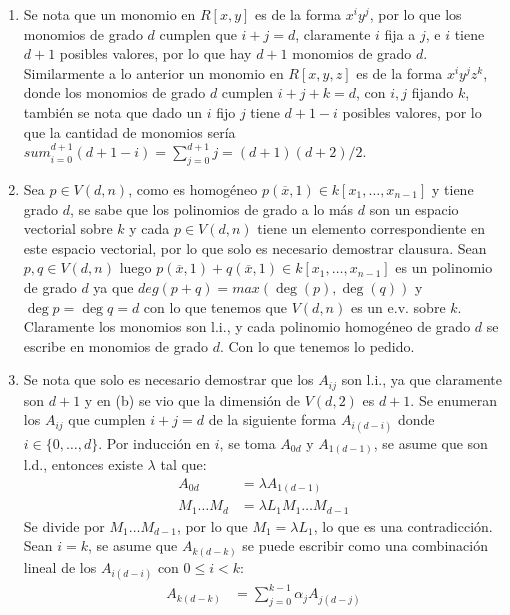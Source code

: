 \begin{sol}{2.35}
    \begin{enumerate}
        \item Se nota que un monomio en \(R[x,y]\) es de la forma \(x^iy^j\), por lo que los monomios de grado \(d\) cumplen que \(i+j=d\), claramente \(i\) fija a \(j\), e \(i\) tiene \(d+1\) posibles valores, por lo que hay \(d+1\) monomios de grado \(d\). Similarmente a lo anterior un monomio en \(R[x,y,z]\) es de la forma \(x^iy^jz^k\), donde los monomios de grado \(d\) cumplen \(i+j+k=d\), con \(i,j\) fijando \(k\), también se nota que dado un \(i\) fijo \(j\) tiene \(d+1-i\) posibles valores, por lo que la cantidad de monomios sería \(sum_{i=0}^{d+1}(d+1-i)=\sum_{j=0}^{d+1}j=(d+1)(d+2)/2\).
        \item Sea \(p\in V(d,n)\), como es homogéneo \(p(\overline{x},1)\in k[x_1,\dots ,x_{n-1}]\) y tiene grado \(d\), se sabe que los polinomios de grado a lo más \(d\) son un espacio vectorial sobre \(k\) y cada \(p\in V(d,n)\) tiene un elemento correspondiente en este espacio vectorial, por lo que solo es necesario demostrar clausura. Sean \(p,q\in V(d,n)\) luego \(p(\overline{x},1)+q(\overline{x},1)\in k[x_1,\dots ,x_{n-1}]\) es un polinomio de grado \(d\) ya que \(deg(p+q)=max(\deg(p),\deg(q))\) y \(\deg p=\deg q=d\) con lo que tenemos que \(V(d,n)\) es un e.v. sobre \(k\). Claramente los monomios son l.i., y cada polinomio homogéneo de grado \(d\) se escribe en monomios de grado \(d\). Con lo que tenemos lo pedido.
        \item Se nota que solo es necesario demostrar que los \(A_{ij}\) son l.i., ya que claramente son \(d+1\) y en (b) se vio que la dimensión de \(V(d,2)\) es \(d+1\). Se enumeran los \(A_{ij}\) que cumplen \(i+j=d\) de la siguiente forma \(A_{i(d-i)}\) donde \(i\in\{0,\dots ,d\}\). Por inducción en \(i\), se toma \(A_{0d}\) y \(A_{1(d-1)}\), se asume que son l.d., entonces existe \(\lambda\) tal que:
        \begin{align*}
            A_{0d} &= \lambda A_{1(d-1)}\\
            M_1\dots M_d &= \lambda L_1M_1\dots M_{d-1}
        \end{align*}
        Se divide por \(M_1\dots M_{d-1}\), por lo que \(M_1=\lambda L_1\), lo que es una contradicción. Sean \(i=k\), se asume que \(A_{k(d-k)}\) se puede escribir como una combinación lineal de los \(A_{i(d-i)}\) con \(0\leq i<k\):
        \begin{align*}
            A_{k(d-k)} & =\sum_{j=0}^{k-1}\alpha_jA_{j(d-j)}\\

\end{align*}
\end{enumerate}
\end{sol}
